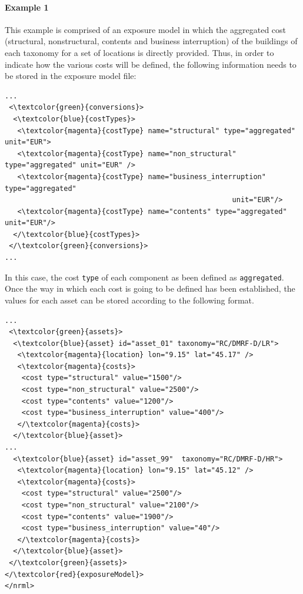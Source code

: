 \paragraph{Example 1}
This example is comprised of an \gls{exposure model} in which the aggregated cost (structural, nonstructural, contents and business interruption) of the buildings of each taxonomy for a set of locations is directly provided. Thus, in order to indicate how the various costs will be defined, the following information needs to be stored in the exposure model file:

\begin{Verbatim}[frame=single, commandchars=\\\{\}, samepage=false]
...
 <\textcolor{green}{conversions}>
  <\textcolor{blue}{costTypes}>
   <\textcolor{magenta}{costType} name="structural" type="aggregated" unit="EUR">
   <\textcolor{magenta}{costType} name="non_structural" type="aggregated" unit="EUR" />
   <\textcolor{magenta}{costType} name="business_interruption" type="aggregated" 
                                                      unit="EUR"/>
   <\textcolor{magenta}{costType} name="contents" type="aggregated" unit="EUR"/>
  </\textcolor{blue}{costTypes}>
 </\textcolor{green}{conversions}>
...
\end{Verbatim}

In this case, the cost \Verb+type+ of each component as been defined as \Verb+aggregated+. Once the way in which each cost is going to be defined has been established, the values for each asset can be stored according to the following format.

\begin{Verbatim}[frame=single, commandchars=\\\{\}, samepage=false]
...
 <\textcolor{green}{assets}>
  <\textcolor{blue}{asset} id="asset_01" taxonomy="RC/DMRF-D/LR">
   <\textcolor{magenta}{location} lon="9.15" lat="45.17" />
   <\textcolor{magenta}{costs}>
    <cost type="structural" value="1500"/>
    <cost type="non_structural" value="2500"/>
    <cost type="contents" value="1200"/>
    <cost type="business_interruption" value="400"/>
   </\textcolor{magenta}{costs}>
  </\textcolor{blue}{asset}>
...
  <\textcolor{blue}{asset} id="asset_99"  taxonomy="RC/DMRF-D/HR">
   <\textcolor{magenta}{location} lon="9.15" lat="45.12" />
   <\textcolor{magenta}{costs}>
    <cost type="structural" value="2500"/>
    <cost type="non_structural" value="2100"/>
    <cost type="contents" value="1900"/>
    <cost type="business_interruption" value="40"/>
   </\textcolor{magenta}{costs}>
  </\textcolor{blue}{asset}>
 </\textcolor{green}{assets}>
</\textcolor{red}{exposureModel}>
</nrml>
\end{Verbatim}

